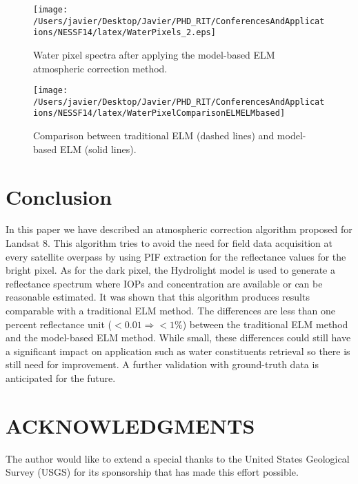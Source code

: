 \documentclass[]{spie}  %
\begin{document}
\begin{figure}[htb]
  \begin{minipage}[c]{0.48\linewidth}
    \centering
      \texttt{[image: /Users/javier/Desktop/Javier/PHD\_RIT/ConferencesAndApplications/NESSF14/latex/WaterPixels\_2.eps]}
      \caption{Water pixel spectra after applying the model-based ELM atmospheric correction method.}
      \label{fig:waterpxs}
  \end{minipage}
  \hfill
  \begin{minipage}[d]{0.48\linewidth}
    \centering
      \texttt{[image: /Users/javier/Desktop/Javier/PHD\_RIT/ConferencesAndApplications/NESSF14/latex/WaterPixelComparisonELMELMbased]}
      \caption{Comparison between traditional ELM (dashed lines) and model-based ELM (solid lines).}
      \label{fig:refcomp}
  \end{minipage}
\end{figure}

\section{Conclusion}
In this paper we have described an atmospheric correction algorithm proposed for Landsat 8. This algorithm tries to avoid the need for field data acquisition at every satellite overpass by using PIF extraction for the reflectance values for the bright pixel. As for the dark pixel, the Hydrolight model is used to generate a reflectance spectrum where IOPs and concentration are available or can be reasonable estimated. It was shown that this algorithm produces results comparable with a traditional ELM method. The differences are less than one percent reflectance unit ($<0.01\Rightarrow <1\%$) between the traditional ELM method and the model-based ELM method. While small, these differences could still have a significant impact on application such as water constituents retrieval so there is still need for improvement. A further validation with ground-truth data is anticipated for the future.

\section*{ACKNOWLEDGMENTS} 
The author would like to extend a special thanks to the United States Geological Survey (USGS) for its sponsorship that has made this effort possible.
\end{document}
